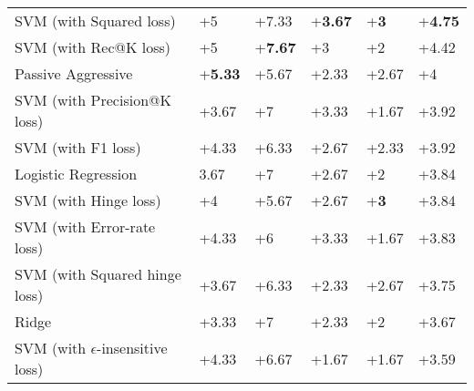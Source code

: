 \begin{table}[h!]
{\begin{tabular}{@{}llllll@{}}
SVM (with Squared loss)                               & +5                       & +7.33                       & +\textbf{3.67}                    & +\textbf{3}                          & +\textbf{4.75}             \\ 
SVM (with Rec@K loss)                                                                      & +5                       & +\textbf{7.67}                       & +{3}              & +2                          & +{4.42}    \\ 
Passive Aggressive                                       & +\textbf{5.33}           & +5.67              & +2.33                    & +2.67                       & +4                \\ 
SVM (with Precision@K loss)                                                                 & +3.67                    & +7                          & +3.33                    & +{1.67}              & +3.92             \\ 
SVM (with F1 loss)                                                                          & +4.33                    & +6.33                       & +2.67                    & +2.33                       & +3.92             \\ 
Logistic Regression                                                      & 3.67                    & +7                          & +2.67                    & +2                          & +3.84             \\ 
SVM (with Hinge loss)                                                                        & +4                       & +5.67                       & +2.67                    & +\textbf{3}                          & +3.84             \\ 
SVM (with Error-rate loss)                                                                    & +4.33                    & +6                          & +3.33                    & +1.67                       & +3.83             \\ 
SVM (with Squared hinge loss)                                                              & +3.67                    & +6.33                       & +2.33                    & +2.67                       & +3.75             \\ 
Ridge                                                             & +3.33                    & +7                          & +2.33                    & +2                          & +3.67             \\ 
SVM (with $\epsilon$-insensitive loss)                         & +4.33                    & +6.67                       & +1.67                    & +1.67                       & +3.59             \\ 

\end{tabular}}
\end{table}
